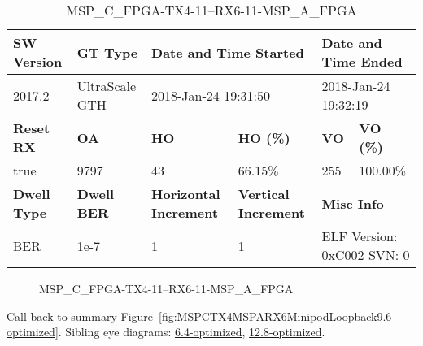\begin{table}[h]
\centering
\caption{MSP\_C\_FPGA-TX4-11--RX6-11-MSP\_A\_FPGA}
\label{tab:MSPCFPGATX411RX611MSPAFPGA9.6-optimized}
\begin{tabular}{@{}|l|l|l|l|l|l|@{}}
\toprule
\textbf{SW Version}                & \textbf{GT Type}   & \multicolumn{2}{l|}{\textbf{Date and Time Started}}            & \multicolumn{2}{l|}{\textbf{Date and Time Ended}}        \\ \midrule
2017.2                       & UltraScale GTH          & \multicolumn{2}{l|}{2018-Jan-24 19:31:50}                   & \multicolumn{2}{l|}{2018-Jan-24 19:32:19}               \\ \midrule
\textbf{Reset RX}                  & \textbf{OA} & \textbf{HO}   & \textbf{HO (\%)} & \textbf{VO} & \textbf{VO (\%)} \\ \midrule
true & 9797        & 43          & 66.15\%        & 255        & 100.00\%       \\ \midrule
\textbf{Dwell Type}                & \textbf{Dwell BER} & \textbf{Horizontal Increment} & \textbf{Vertical Increment}    & \multicolumn{2}{l|}{\textbf{Misc Info}}                  \\ \midrule
BER                            & 1e-7        & 1        & 1           & \multicolumn{2}{l|}{ELF Version: 0xC002 SVN: 0}                         \\ \bottomrule
\end{tabular}
\end{table}

\begin{figure}[h]
\caption{MSP\_C\_FPGA-TX4-11--RX6-11-MSP\_A\_FPGA} \label{fig:MSPCFPGATX411RX611MSPAFPGA9.6-optimized}
\end{figure}

Call back to summary Figure~\ref{fig:MSPCTX4MSPARX6MinipodLoopback9.6-optimized}.
Sibling eye diagrams: \hyperref[sec:MSPCFPGATX411RX611MSPAFPGA6.4-optimized]{6.4-optimized}, \hyperref[sec:MSPCFPGATX411RX611MSPAFPGA12.8-optimized]{12.8-optimized}.

\clearpage
\newpage

